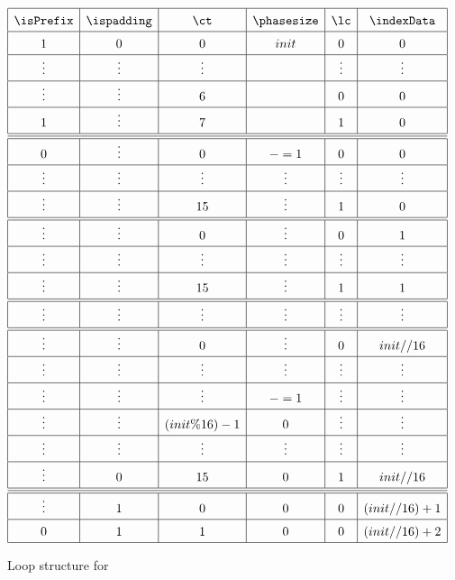 \begin{figure}
\[
    \renewcommand{\arraystretch}{1.5}
    \begin{array}{|c|c|c|c|c|c|} \hline
        \isPrefix & \ispadding & \ct             & \phasesize & \lc    & \indexData     \\ \hline
        1         & 0          & 0               & init       & 0      & 0              \\ \hline
        \vdots    & \vdots     & \vdots          &            & \vdots & \vdots         \\ \hline
        \vdots    & \vdots     & 6               &            & 0      & 0              \\ \hline
        1         & \vdots     & 7               &            & 1      & 0              \\ \hline \hline \hline
        0         & \vdots     & 0               & -=1        & 0      & 0              \\ \hline
        \vdots    & \vdots     & \vdots          & \vdots     & \vdots & \vdots         \\ \hline
        \vdots    & \vdots     & 15              & \vdots     & 1      & 0              \\ \hline \hline
        \vdots    & \vdots     & 0               & \vdots     & 0      & 1              \\ \hline
        \vdots    & \vdots     & \vdots          & \vdots     & \vdots & \vdots         \\ \hline
        \vdots    & \vdots     & 15              & \vdots     & 1      & 1              \\ \hline \hline
        \vdots    & \vdots     & \vdots          & \vdots     & \vdots & \vdots         \\ \hline \hline
        \vdots    & \vdots     & 0               & \vdots     & 0      & init // 16     \\ \hline
        \vdots    & \vdots     & \vdots          & \vdots     & \vdots & \vdots         \\ \hline
        \vdots    & \vdots     & \vdots          & -=1        & \vdots & \vdots         \\ \hline
        \vdots    & \vdots     & (init \% 16) -1 & 0          & \vdots & \vdots         \\ \hline
        \vdots    & \vdots     & \vdots          & \vdots     & \vdots & \vdots         \\ \hline
        \vdots    & 0          & 15              & 0          & 1      & init // 16     \\ \hline \hline \hline
        \vdots    & 1          & 0               & 0          & 0      & (init // 16)+1 \\ \hline
        0         & 1          & 1               & 0          & 0      & (init // 16)+2 \\ \hline
    \end{array}
\]
\caption{Loop structure for }
\label{Phase 9 loop}
\end{figure}
